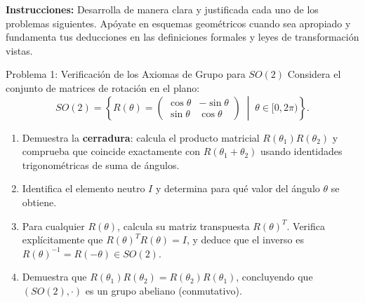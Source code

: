 \documentclass[11pt,letterpaper]{article}
\begin{document}
\setlength{\abovedisplayskip}{6pt}
\setlength{\belowdisplayskip}{6pt}
\setlength{\textfloatsep}{10pt}
\setlength{\intextsep}{8pt}
\color{blackmain}


\noindent\textbf{Instrucciones:} Desarrolla de manera clara y justificada cada uno de los problemas siguientes. Apóyate en esquemas geométricos cuando sea apropiado y fundamenta tus deducciones en las definiciones formales y leyes de transformación vistas.


\begin{infobox}{Problema 1: Verificación de los Axiomas de Grupo para $SO(2)$}
Considera el conjunto de matrices de rotación en el plano:
\[
SO(2) = \left\{ R(\theta) = \begin{pmatrix} \cos\theta & -\sin\theta \\ \sin\theta & \cos\theta \end{pmatrix} \;\middle|\; \theta \in [0, 2\pi) \right\}.
\]
\begin{enumerate}[label=(\alph*)]
    \item Demuestra la \textbf{cerradura}: calcula el producto matricial $R(\theta_1)R(\theta_2)$ y comprueba que coincide exactamente con $R(\theta_1 + \theta_2)$ usando identidades trigonométricas de suma de ángulos.
    \item Identifica el elemento neutro $I$ y determina para qué valor del ángulo $\theta$ se obtiene.
    \item Para cualquier $R(\theta)$, calcula su matriz transpuesta $R(\theta)^T$. Verifica explícitamente que $R(\theta)^T R(\theta) = I$, y deduce que el inverso es $R(\theta)^{-1} = R(-\theta) \in SO(2)$.
    \item Demuestra que $R(\theta_1)R(\theta_2) = R(\theta_2)R(\theta_1)$, concluyendo que $(SO(2), \cdot)$ es un grupo abeliano (conmutativo).
\end{enumerate}
\end{infobox}
\end{document}
